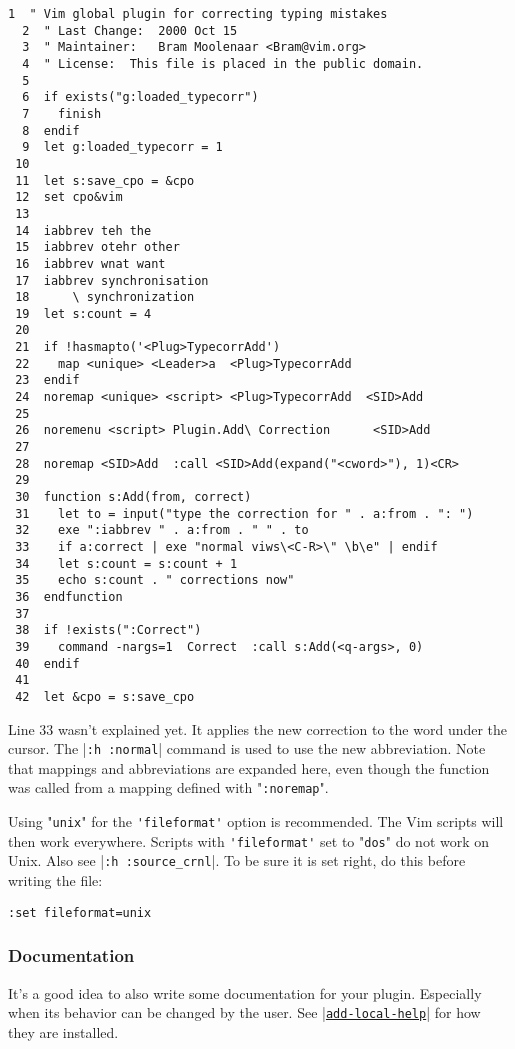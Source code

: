\begin{Verbatim}[samepage=true]
  1  " Vim global plugin for correcting typing mistakes
  2  " Last Change:  2000 Oct 15
  3  " Maintainer:   Bram Moolenaar <Bram@vim.org>
  4  " License:  This file is placed in the public domain.
  5
  6  if exists("g:loaded_typecorr")
  7    finish
  8  endif
  9  let g:loaded_typecorr = 1
 10
 11  let s:save_cpo = &cpo
 12  set cpo&vim
 13
 14  iabbrev teh the
 15  iabbrev otehr other
 16  iabbrev wnat want
 17  iabbrev synchronisation
 18      \ synchronization
 19  let s:count = 4
 20
 21  if !hasmapto('<Plug>TypecorrAdd')
 22    map <unique> <Leader>a  <Plug>TypecorrAdd
 23  endif
 24  noremap <unique> <script> <Plug>TypecorrAdd  <SID>Add
 25
 26  noremenu <script> Plugin.Add\ Correction      <SID>Add
 27
 28  noremap <SID>Add  :call <SID>Add(expand("<cword>"), 1)<CR>
 29
 30  function s:Add(from, correct)
 31    let to = input("type the correction for " . a:from . ": ")
 32    exe ":iabbrev " . a:from . " " . to
 33    if a:correct | exe "normal viws\<C-R>\" \b\e" | endif
 34    let s:count = s:count + 1
 35    echo s:count . " corrections now"
 36  endfunction
 37
 38  if !exists(":Correct")
 39    command -nargs=1  Correct  :call s:Add(<q-args>, 0)
 40  endif
 41
 42  let &cpo = s:save_cpo
\end{Verbatim}

Line 33 wasn't explained yet.
It applies the new correction to the word under the cursor.
The |\verb!:h :normal!| command is used to use the new abbreviation.
Note that mappings and abbreviations are expanded here, even though the function was called from a mapping defined with "\verb!:noremap!".

Using "\verb!unix!" for the \verb!'fileformat'! option is recommended.
The Vim scripts will then work everywhere.
Scripts with \verb!'fileformat'! set to "\verb!dos!" do not work on Unix.
Also see |\verb!:h :source_crnl!|.
To be sure it is set right, do this before writing the file:

\begin{Verbatim}[samepage=true]
 :set fileformat=unix
\end{Verbatim}

\subsubsection{Documentation}
\label{write-local-help}
It's a good idea to also write some documentation for your plugin.
Especially when its behavior can be changed by the user.
See \hyperref[add-local-help]{|\texttt{add-local-help}|} for how they are installed.

